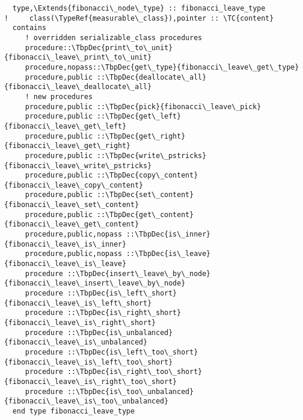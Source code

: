 \begin{Verbatim}
  type,\Extends{fibonacci\_node\_type} :: fibonacci_leave_type
!     class(\TypeRef{measurable\_class}),pointer :: \TC{content}
  contains
     ! overridden serializable_class procedures
     procedure::\TbpDec{print\_to\_unit}{fibonacci\_leave\_print\_to\_unit}
     procedure,nopass::\TbpDec{get\_type}{fibonacci\_leave\_get\_type}
     procedure,public ::\TbpDec{deallocate\_all}{fibonacci\_leave\_deallocate\_all}
     ! new procedures
     procedure,public ::\TbpDec{pick}{fibonacci\_leave\_pick}
     procedure,public ::\TbpDec{get\_left}{fibonacci\_leave\_get\_left}
     procedure,public ::\TbpDec{get\_right}{fibonacci\_leave\_get\_right}
     procedure,public ::\TbpDec{write\_pstricks}{fibonacci\_leave\_write\_pstricks}
     procedure,public ::\TbpDec{copy\_content}{fibonacci\_leave\_copy\_content}
     procedure,public ::\TbpDec{set\_content}{fibonacci\_leave\_set\_content}
     procedure,public ::\TbpDec{get\_content}{fibonacci\_leave\_get\_content}
     procedure,public,nopass ::\TbpDec{is\_inner}{fibonacci\_leave\_is\_inner}
     procedure,public,nopass ::\TbpDec{is\_leave}{fibonacci\_leave\_is\_leave}
     procedure ::\TbpDec{insert\_leave\_by\_node}{fibonacci\_leave\_insert\_leave\_by\_node}
     procedure ::\TbpDec{is\_left\_short}{fibonacci\_leave\_is\_left\_short}
     procedure ::\TbpDec{is\_right\_short}{fibonacci\_leave\_is\_right\_short}
     procedure ::\TbpDec{is\_unbalanced}{fibonacci\_leave\_is\_unbalanced}
     procedure ::\TbpDec{is\_left\_too\_short}{fibonacci\_leave\_is\_left\_too\_short}
     procedure ::\TbpDec{is\_right\_too\_short}{fibonacci\_leave\_is\_right\_too\_short}
     procedure ::\TbpDec{is\_too\_unbalanced}{fibonacci\_leave\_is\_too\_unbalanced}
  end type fibonacci_leave_type
\end{Verbatim}
